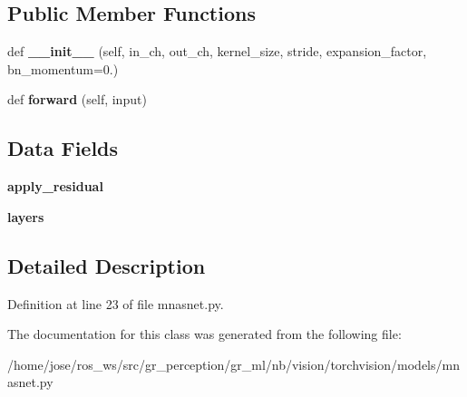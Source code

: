 \subsection*{Public Member Functions}
\begin{DoxyCompactItemize}
\item 
\mbox{\label{classtorchvision_1_1models_1_1mnasnet_1_1__InvertedResidual_a1aaabc0732d8a5e09a82e92a2d8c1ce2}} 
def {\bfseries \+\_\+\+\_\+init\+\_\+\+\_\+} (self, in\+\_\+ch, out\+\_\+ch, kernel\+\_\+size, stride, expansion\+\_\+factor, bn\+\_\+momentum=0.)
\item 
\mbox{\label{classtorchvision_1_1models_1_1mnasnet_1_1__InvertedResidual_a7e935aea2f25a765bc82b609043f7f0e}} 
def {\bfseries forward} (self, input)
\end{DoxyCompactItemize}
\subsection*{Data Fields}
\begin{DoxyCompactItemize}
\item 
\mbox{\label{classtorchvision_1_1models_1_1mnasnet_1_1__InvertedResidual_a85b4b4e4515faa7ca3c201be3019bd1c}} 
{\bfseries apply\+\_\+residual}
\item 
\mbox{\label{classtorchvision_1_1models_1_1mnasnet_1_1__InvertedResidual_af691d4125fec58d155b90db42e13076e}} 
{\bfseries layers}
\end{DoxyCompactItemize}


\subsection{Detailed Description}


Definition at line 23 of file mnasnet.\+py.



The documentation for this class was generated from the following file\+:\begin{DoxyCompactItemize}
\item 
/home/jose/ros\+\_\+ws/src/gr\+\_\+perception/gr\+\_\+ml/nb/vision/torchvision/models/mnasnet.\+py\end{DoxyCompactItemize}
